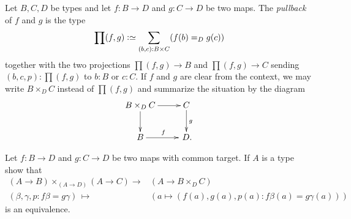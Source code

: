 





\label{sec:pullback}

\begin{definition}
  \label{def:pullback}
  Let $B, C, D$ be types and let $f:B\to D$ and $g:C\to D$ be two maps.  
The \emph{pullback} of $f$ and $g$ is the type 
$$\prod(f,g)\defequi\sum_{(b,c):B\times C}(f(b)=_Dg(c))$$
together with the two projections $\prod(f,g)\to B$ and $\prod(f,g)\to C$ sending $(b,c,p):\prod(f,g)$ to $b:B$ or $c:C$.  If $f$ and $g$ are clear from the context, we may write $B\times_DC$ instead of $\prod(f,g)$ and summarize the situation by the diagram
$$\xymatrix{B\times_DC\ar[r]\ar[d]&C\ar[d]^g\\B\ar[r]^f&\,D.}$$
\end{definition}
\begin{xca}
  \label{xca:univpropofpullback}
  Let $f:B\to D$ and $g:C\to D$ be two maps with common target.  If $A$ is a type show that 
  \begin{align*}
    (A\to B)\times_{(A\to D)}(A\to C)\to &(A\to B\times_DC)\\ 
(\beta,\gamma,p:f\beta=g\gamma)\,\mapsto\,&(a\mapsto (f(a),g(a),p(a):f\beta(a)=g\gamma(a)))
  \end{align*}
 is an equivalence.
\end{xca}

